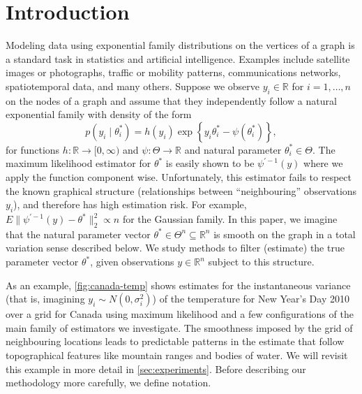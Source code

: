 \documentclass[ejs,noshowframe]{imsart}
\theoremstyle{plain}
\theoremstyle{definition}
\newcommand{\snorm}[1]{\lVert #1 \rVert}
\newcommand{\R}{\mathbb{R}}
\newcommand{\E}{E}
\newcommand{\given}{\mid}
\begin{document}
\tableofcontents
\section{Introduction}
\label{sec:introduction}



Modeling data using exponential family distributions on the vertices of a graph
is a standard task in statistics and artificial intelligence. Examples include
satellite images or photographs, traffic or mobility patterns, communications
networks, spatiotemporal data, and many others. Suppose we observe $y_i \in \R$
for $i=1,\ldots,n$ on the nodes of a graph and assume that they independently
follow a natural exponential family with density of the form
\begin{equation}
  \label{eq:exp-fam}
  p(y_i \given \theta_i^*) = h(y_i)\exp\left\{y_i\theta_i^*
    - \psi(\theta_i^*)\right\},
\end{equation}
for functions $h: \R \rightarrow [0,\infty)$ and $\psi:
\Theta\rightarrow\R$ and natural parameter $\theta^*_i \in \Theta.$ The maximum
likelihood estimator for $\theta^*$ is easily shown to be $\psi^{\prime -1}(y)$
where we apply the function component wise. Unfortunately, this estimator fails
to respect the known graphical structure (relationships between ``neighbouring'' observations $y_i$), 
and therefore has high estimation risk.
For example, $\E\snorm{\psi^{\prime -1}(y) -\theta^*}^2_2 \propto n$ for the Gaussian 
family. In this paper, we imagine
that the natural parameter vector $\theta^* \in \Theta^n \subseteq \R^n$ is smooth on
the graph in a total variation sense described below.
We study methods to filter (estimate) the true parameter vector $\theta^*$, given
observations $y\in \R^n$ subject to this structure.


As an example, \autoref{fig:canada-temp} shows estimates for the instantaneous
variance (that is, imagining $y_i \sim N(0, \sigma_i^2)$) of the temperature
for New Year's Day 2010 over a grid for Canada using maximum likelihood and a few
configurations of the main family of estimators we investigate. The smoothness
imposed by the grid of neighbouring locations leads to predictable patterns in
the estimate that follow topographical features like mountain ranges and bodies
of water. We will revisit this example in more detail in
\autoref{sec:experiments}. Before describing our methodology more
carefully, we define notation.
\end{document}
